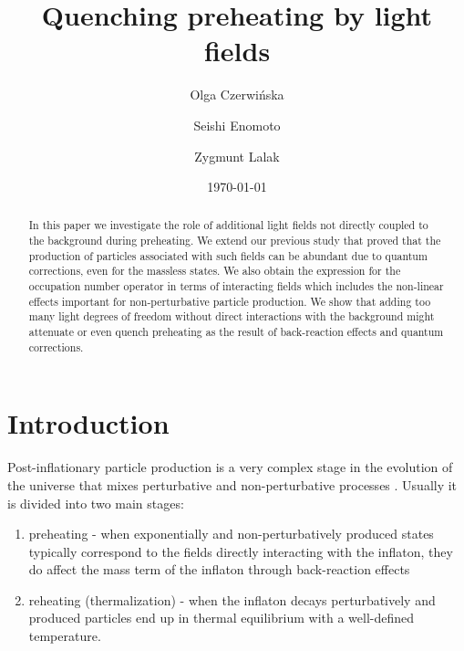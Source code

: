 \documentclass[twocolumn,showpacs,preprintnumbers,amsmath,amssymb,nofootinbib,superscriptaddress,prc]{revtex4}
\begin{document}
\preprint{}

\title{Quenching preheating by light fields}

\author{Olga Czerwi\'nska}
\author{Seishi Enomoto}
\author{Zygmunt Lalak}

\date{\today}

\begin{abstract}

In this paper we investigate the role of additional light fields not directly coupled to the background during preheating. We extend our previous study that proved that the production of particles associated with such fields can be abundant due to quantum corrections, even for the massless states. We also obtain the expression for the occupation number operator in terms of interacting fields which includes the non-linear effects important for non-perturbative particle production. We show that adding too many light degrees of freedom without direct interactions with the background might attenuate or even quench preheating as the result of back-reaction effects and quantum corrections.

\end{abstract}


\maketitle

\section{Introduction}

Post-inflationary particle production is a very complex stage in the evolution of the universe that mixes perturbative and non-perturbative processes \cite{Kofman:1994rk, Kofman:1997yn, Traschen:1990sw, Dolgov:1989us, Kofman:2004yc}. Usually it is divided into two main stages:
\begin{enumerate}[label=\alph*)]
\item preheating - when exponentially and non-perturbatively produced states typically correspond to the fields directly interacting with the inflaton, they do affect the mass term of the inflaton through back-reaction effects
\item reheating (thermalization) - when the inflaton decays perturbatively and produced particles end up in thermal equilibrium with a well-defined temperature.
\end{enumerate} 
\end{document}
